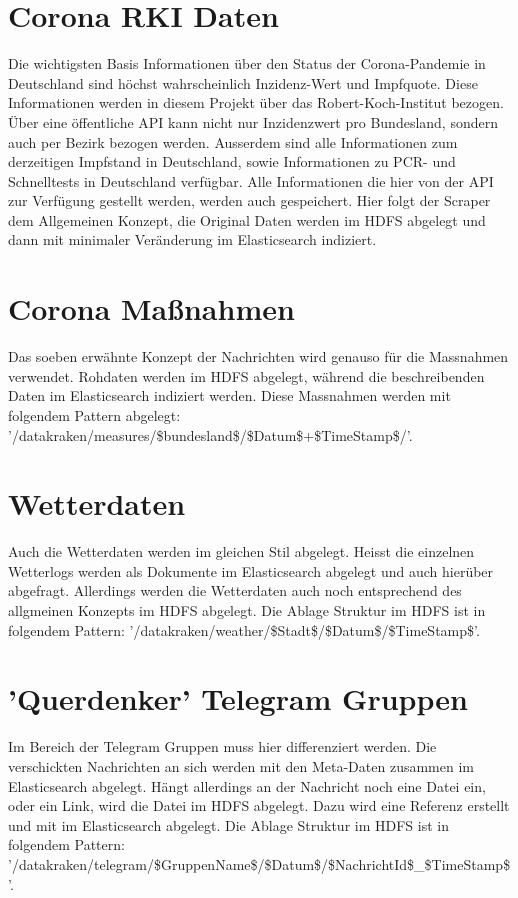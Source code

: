 \documentclass[12pt,oneside,a4paper,parskip]{scrbook}
\begin{document}
\section{Corona RKI Daten}
Die wichtigsten Basis Informationen \"uber den Status der Corona-Pandemie in Deutschland sind h\"ochst wahrscheinlich Inzidenz-Wert und Impfquote. Diese Informationen werden in diesem Projekt \"uber das Robert-Koch-Institut bezogen. \"Uber eine \"offentliche API kann nicht nur Inzidenzwert pro Bundesland, sondern auch per Bezirk bezogen werden. Ausserdem sind alle Informationen zum derzeitigen Impfstand in Deutschland, sowie Informationen zu PCR- und Schnelltests in Deutschland verf\"ugbar. Alle Informationen die hier von der API zur Verf\"ugung gestellt werden, werden auch gespeichert. Hier folgt der Scraper dem Allgemeinen Konzept, die Original Daten werden im HDFS abgelegt und dann mit minimaler Ver\"anderung im Elasticsearch indiziert.
\section{Corona Maßnahmen}
Das soeben erw\"ahnte Konzept der Nachrichten wird genauso f\"ur die Massnahmen verwendet. Rohdaten werden im HDFS abgelegt, w\"ahrend die beschreibenden Daten im Elasticsearch indiziert werden. Diese Massnahmen werden mit folgendem Pattern abgelegt: '/datakraken/measures/\$bundesland\$/\$Datum\$+\$TimeStamp\$/'.
\section{Wetterdaten}
Auch die Wetterdaten werden im gleichen Stil abgelegt. Heisst die einzelnen Wetterlogs werden als Dokumente im Elasticsearch abgelegt und auch hier\"uber abgefragt. Allerdings werden die Wetterdaten auch noch entsprechend des allgmeinen Konzepts im HDFS abgelegt. Die Ablage Struktur im HDFS ist in folgendem Pattern:  '/datakraken/weather/\$Stadt\$/\$Datum\$/\$TimeStamp\$'.
\section{'Querdenker' Telegram Gruppen}
Im Bereich der Telegram Gruppen muss hier differenziert werden. Die verschickten Nachrichten an sich werden mit den Meta-Daten zusammen im Elasticsearch abgelegt. H\"angt allerdings an der Nachricht noch eine Datei ein, oder ein Link, wird die Datei im HDFS abgelegt. Dazu wird eine Referenz erstellt und mit im Elasticsearch abgelegt. Die Ablage Struktur im HDFS ist in folgendem Pattern: '/datakraken/telegram/\$GruppenName\$/\$Datum\$/\$NachrichtId\$\_\$TimeStamp\$'.
\end{document}
